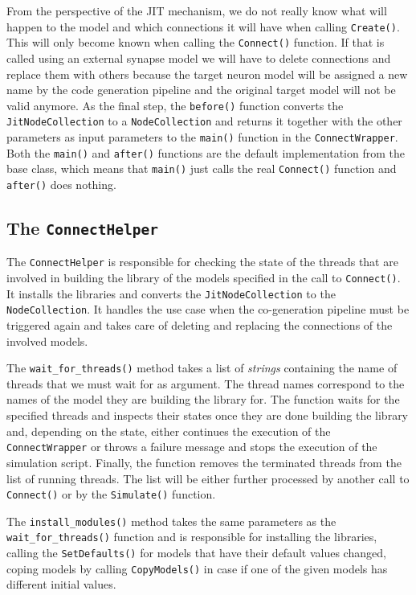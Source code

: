 From the perspective of the JIT mechanism, we do not really know what will happen to the model and which connections it will have when calling \texttt{Create()}. This will only become known when calling the \texttt{Connect()} function. If that is called using an external synapse model we will have to delete connections and replace them with others because the target neuron model will be assigned a new name by the code generation pipeline and the original target model will not be valid anymore. As the final step, the \texttt{before()} function converts the \texttt{JitNodeCollection} to a \texttt{NodeCollection} and returns it together with the other parameters as input parameters to the \texttt{main()} function in the \texttt{ConnectWrapper}. Both the \texttt{main()} and \texttt{after()} functions are the default implementation from the base class, which means that \texttt{main()} just calls the real \texttt{Connect()} function and \texttt{after()} does nothing.

\subsection{The \texttt{ConnectHelper}}

The \texttt{ConnectHelper} is responsible for checking the state of the threads that are involved in building the library of the models specified in the call to \texttt{Connect()}. It installs the libraries and converts the \texttt{JitNodeCollection} to the \texttt{NodeCollection}. It handles the use case when the co-generation pipeline must be triggered again and takes care of deleting and replacing the connections of the involved models.

The \texttt{wait\_for\_threads()} method takes a list of \emph{strings} containing the name of threads that we must wait for as argument. The thread names correspond to the names of the model they are building the library for. The function waits for the specified threads and inspects their states once they are done building the library and, depending on the state, either continues the execution of the \texttt{ConnectWrapper} or throws a failure message and stops the execution of the simulation script. Finally, the function removes the terminated threads from the list of running threads. The list will be either further processed by another call to \texttt{Connect()} or by the \texttt{Simulate()} function.

The \texttt{install\_modules()} method takes the same parameters as the  \texttt{wait\_for\_threads()} function and is responsible for installing the libraries, calling the \texttt{SetDefaults()} for models that have their default values changed, coping models by calling \texttt{CopyModels()} in case if one of the given models has different initial values.


